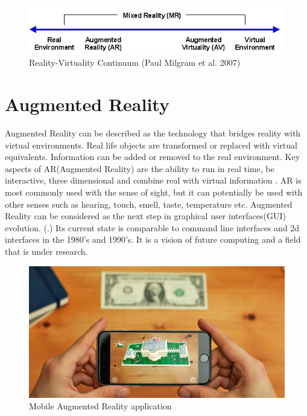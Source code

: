\documentclass[12pt, a4paper,oneside, nocenter]{thesis}
\renewcommand{\citep}[1]{(\citealp{#1}.)}
\begin{document}
\begin{figure}[H]
\includegraphics[width=\textwidth]{Virtuality_Continuum_2}
\caption{Reality-Virtuality Continuum (Paul Milgram et al. 2007)}
\label{fig:reality-virtuality}
\end{figure}

\section{Augmented Reality}%
Augmented Reality can be described as the technology that bridges reality with virtual environments. Real life objects are transformed or replaced with virtual equivalents. Information can be added or removed to the real environment. Key aspects of AR(Augmented Reality) are the ability to run in real time, be interactive, three dimensional and combine real with virtual information . AR is most commonly used with the sense of sight, but it can potentially be used with other senses such as hearing, touch, smell, taste, temperature etc. Augmented Reality can be considered as the next step in graphical user interfaces(GUI) evolution. \citep{prototyping-ar} Its current state is comparable to command line interfaces and 2d interfaces in the 1980's and 1990's. It is a vision of future computing and a field that is under research.
\begin{figure}[H]
	\includegraphics[width=\textwidth]{ar-application}
	\caption{Mobile Augmented Reality application \citeyearpar{ar-application-whitehouse}}
	\label{fig:ar-application}
\end{figure}
\end{document}
